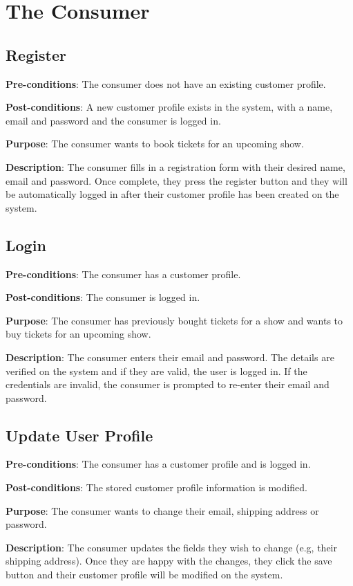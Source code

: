 \section{The Consumer}

\subsection{Register}
\textbf{Pre-conditions}: The consumer does not have an existing
customer profile.

\textbf{Post-conditions}: A new customer profile exists in the
system, with a name, email and password and the consumer is logged
in.

\textbf{Purpose}: The consumer wants to book tickets for an
upcoming show.

\textbf{Description}: The consumer fills in a registration form with
their desired name, email and password. Once complete, they press
the register button and they will be automatically logged in after
their customer profile has been created on the system.

\subsection{Login}
\textbf{Pre-conditions}: The consumer has a customer profile.

\textbf{Post-conditions}: The consumer is logged in.

\textbf{Purpose}: The consumer has previously bought tickets for a
show and wants to buy tickets for an upcoming show.

\textbf{Description}: The consumer enters their email and password.
The details are verified on the system and if they are valid, the
user is logged in. If the credentials are invalid, the consumer is
prompted to re-enter their email and password.

\subsection{Update User Profile}
\textbf{Pre-conditions}: The consumer has a customer profile and is
logged in.

\textbf{Post-conditions}: The stored customer profile information is
modified.

\textbf{Purpose}: The consumer wants to change their email, shipping
address or password.

\textbf{Description}: The consumer updates the fields they wish to
change (e.g, their shipping address). Once they are happy with the
changes, they click the save button and their customer profile will
be modified on the system.

